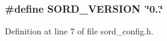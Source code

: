 \subsubsection[{\texorpdfstring{S\+O\+R\+D\+\_\+\+V\+E\+R\+S\+I\+ON}{SORD_VERSION}}]{\setlength{\rightskip}{0pt plus 5cm}\#define S\+O\+R\+D\+\_\+\+V\+E\+R\+S\+I\+ON~\char`\"{}0..\char`\"{}}\hypertarget{lib-src_2lv2_2windows_2sord__config_8h_ab9ed0ad193c2d4ad08433bb36fff63dd}{}\label{lib-src_2lv2_2windows_2sord__config_8h_ab9ed0ad193c2d4ad08433bb36fff63dd}


Definition at line 7 of file sord\+\_\+config.\+h.

